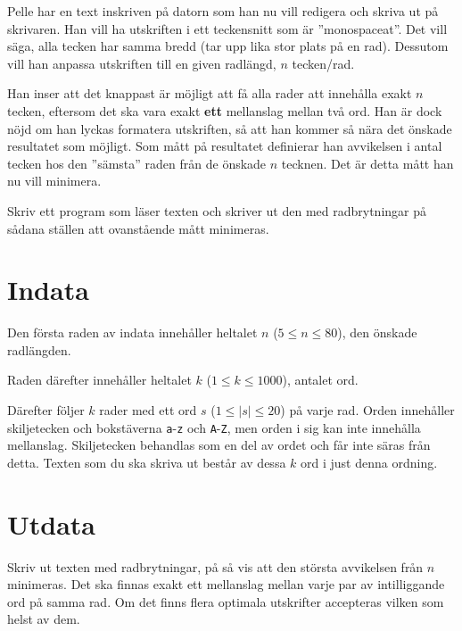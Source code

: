 
Pelle har en text inskriven på datorn som han nu vill redigera och skriva ut på skrivaren.
Han vill ha utskriften i ett teckensnitt som är ''monospaceat''.
Det vill säga, alla tecken har samma bredd (tar upp lika stor plats på en rad).
Dessutom vill han anpassa utskriften till en given radlängd, $n$ tecken/rad.

Han inser att det knappast är möjligt att få alla rader att innehålla exakt $n$ tecken,
eftersom det ska vara exakt \textbf{ett} mellanslag mellan två ord.
Han är dock nöjd om han lyckas formatera utskriften, så att han kommer så nära det önskade resultatet som möjligt.
Som mått på resultatet definierar han avvikelsen i antal tecken hos den ''sämsta'' raden från de önskade $n$ tecknen.
Det är detta mått han nu vill minimera. 

Skriv ett program som läser texten och skriver ut den med radbrytningar på sådana ställen att ovanstående mått minimeras.

\section*{Indata}
Den första raden av indata innehåller heltalet $n$ ($5 \leq n \leq 80$),
den önskade radlängden.

Raden därefter innehåller heltalet $k$ ($1 \leq k \leq 1000$),
antalet ord.

Därefter följer $k$ rader med ett ord $s$ ($1 \leq |s| \leq 20$) på varje rad.
Orden innehåller skiljetecken och bokstäverna \texttt{a}-\texttt{z} och \texttt{A}-\texttt{Z}, men orden i sig kan inte innehålla mellanslag.
Skiljetecken behandlas som en del av ordet och får inte säras från detta.
Texten som du ska skriva ut består av dessa $k$ ord i just denna ordning.

\section*{Utdata}
Skriv ut texten med radbrytningar, på så vis att den största avvikelsen från $n$ minimeras.
Det ska finnas exakt ett mellanslag mellan varje par av intilliggande ord på samma rad.
Om det finns flera optimala utskrifter accepteras vilken som helst av dem.
